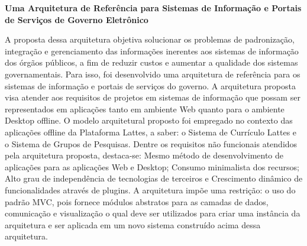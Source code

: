 \textbf{Uma Arquitetura de Referência para Sistemas de Informação e Portais de Serviços de Governo Eletrônico}\par
A proposta dessa arquitetura objetiva solucionar os problemas de padronização, integração e gerenciamento das informações inerentes aos sistemas de informação dos órgãos públicos, a fim de reduzir custos e aumentar a qualidade dos sistemas governamentais. Para isso, foi desenvolvido uma arquitetura de referência para os sistemas de informação e portais de serviços do governo. A arquitetura proposta visa atender aos requisitos de projetos em sistemas de informação que possam ser representados em aplicações tanto em ambiente Web quanto para o ambiente Desktop offline. O modelo arquitetural proposto foi empregado no contexto das aplicações offline da Plataforma Lattes, a saber: o Sistema de Currículo Lattes e o Sistema de Grupos de Pesquisas. Dentre os requisitos não funcionais atendidos pela arquitetura proposta, destaca-se: Mesmo método de desenvolvimento de aplicações para as aplicações Web e Desktop; Consumo minimalista dos recursos; Alto grau de independência de tecnologias de terceiros e Crescimento dinâmico de funcionalidades através de plugins. A arquitetura impõe uma restrição: o uso do padrão MVC, pois fornece módulos abstratos para as camadas de dados, comunicação e visualização o qual deve ser utilizados para criar uma instância da arquitetura e ser aplicada em um novo sistema construído acima dessa arquitetura.


